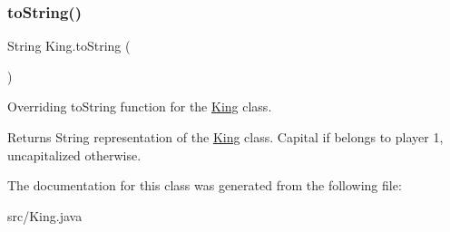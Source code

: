 \subsubsection{\texorpdfstring{to\+String()}{toString()}}
{\footnotesize\ttfamily String King.\+to\+String (\begin{DoxyParamCaption}{ }\end{DoxyParamCaption})}

Overriding to\+String function for the \mbox{\hyperlink{class_king}{King}} class. \begin{DoxyReturn}{Returns}
String representation of the \mbox{\hyperlink{class_king}{King}} class. Capital if belongs to player 1, uncapitalized otherwise. 
\end{DoxyReturn}


The documentation for this class was generated from the following file\+:\begin{DoxyCompactItemize}
\item 
src/King.\+java\end{DoxyCompactItemize}
